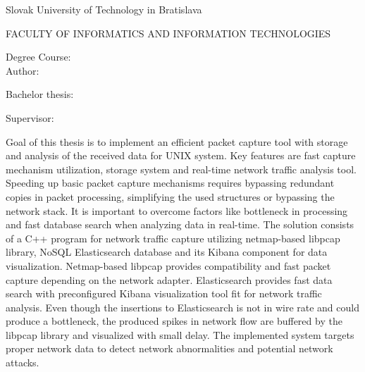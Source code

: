 \noindent
Slovak University of Technology in Bratislava 

\noindent
FACULTY OF INFORMATICS AND INFORMATION TECHNOLOGIES

\noindent
Degree Course: \myStudyProgram\\

\noindent
Author: \myName

\noindent
Bachelor thesis: \myTitle

\noindent
Supervisor: \mySupervisor

\noindent
\myDate%

\bigskip{}

\noindent
Goal of this thesis is to implement an efficient packet capture tool with storage and analysis of the received data for UNIX system. Key features are fast capture mechanism utilization, storage system and real-time network traffic analysis tool. Speeding up basic packet capture mechanisms requires bypassing redundant copies in packet processing, simplifying the used structures or bypassing the network stack. It is important to overcome factors like bottleneck in processing and fast database search when analyzing data in real-time. The solution consists of a C++ program for network traffic capture utilizing netmap-based libpcap library, NoSQL Elasticsearch database and its Kibana component for data visualization. Netmap-based libpcap provides compatibility and fast packet capture depending on the network adapter. Elasticsearch provides fast data search with preconfigured Kibana visualization tool fit for network traffic analysis. Even though the insertions to Elasticsearch is not in wire rate and could produce a bottleneck, the produced spikes in network flow are buffered by the libpcap library and visualized with small delay. The implemented system targets proper network data to detect network abnormalities and potential network attacks.

\newpage{}\thispagestyle{empty}\medskip{}


\newpage{}

\newpage
\thispagestyle{empty}
\mbox{}
\newpage



